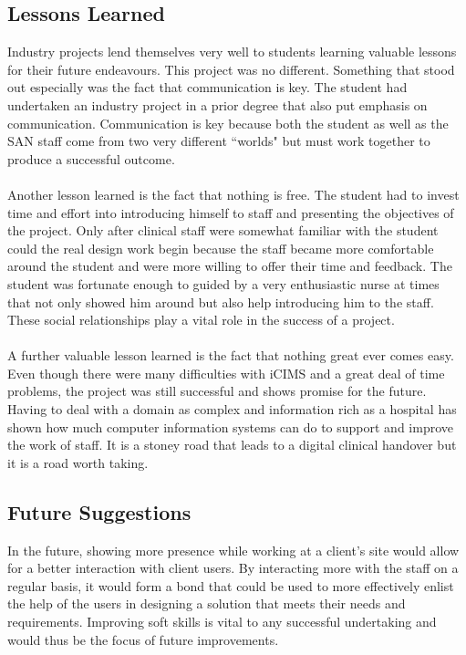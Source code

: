 \subsection{Lessons Learned}
Industry projects lend themselves very well to students learning valuable lessons for their future endeavours. This project was no different. Something that stood out especially was the fact that communication is key. The student had undertaken an industry project in a prior degree that also put emphasis on communication. Communication is key because both the student as well as the SAN staff come from two very different ``worlds" but must work together to produce a successful outcome. 
\\ \\
Another lesson learned is the fact that nothing is free. The student had to invest time and effort into introducing himself to staff and presenting the objectives of the project. Only after clinical staff were somewhat familiar with the student could the real design work begin because the staff became more comfortable around the student and were more willing to offer their time and feedback. The student was fortunate enough to guided by a very enthusiastic nurse at times that not only showed him around but also help introducing him to the staff. These social relationships play a vital role in the success of a project.
\\ \\
A further valuable lesson learned is the fact that nothing great ever comes easy. Even though there were many difficulties with iCIMS and a great deal of time problems, the project was still successful and shows promise for the future. Having to deal with a domain as complex and information rich as a hospital has shown how much computer information systems can do to support and improve the work of staff. It is a stoney road that leads to a digital clinical handover but it is a road worth taking.

\subsection{Future Suggestions}
In the future, showing more presence while working at a client's site would allow for a better interaction with client users. By interacting more with the staff on a regular basis, it would form a bond that could be used to more effectively enlist the help of the users in designing a solution that meets their needs and requirements. Improving soft skills is vital to any successful undertaking and would thus be the focus of future improvements.